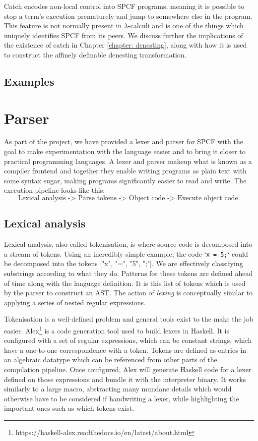 \documentclass[12pt,a4paper]{report}
\theoremstyle{definition}
\theoremstyle{remark}
\begin{document}
Catch encodes non-local control into SPCF programs, meaning it is possible to stop a term's execution prematurely and jump to somewhere else in the program. This feature is not normally present in $\lambda$-calculi and is one of the things which uniquely identifies SPCF from its peers. We discuss further the implications of the existence of catch in Chapter \ref{chapter: denesting}, along with how it is used to construct the affinely definable denesting transformation.

\subsection{Examples}

\section{Parser}
As part of the project, we have provided a lexer and parser for SPCF with the goal to make experimentation with the language easier and to bring it closer to practical programming languages. A lexer and parser makeup what is known as a compiler frontend and together they enable writing programs as plain text with some syntax sugar, making programs significantly easier to read and write. The execution pipeline looks like this:
\[\text{Lexical analysis -> Parse tokens -> Object code -> Execute object code}.\]

\subsection{Lexical analysis}
Lexical analysis, also called tokenisation, is where source code is decomposed into a stream of tokens. Using an incredibly simple example, the code `\lstinline{x = 5;}` could be decomposed into the tokens ["x", "=", "5", ";"]. We are effectively classifying substrings according to what they do. Patterns for these tokens are defined ahead of time along with the language definition. It is this list of tokens which is used by the parser to construct an AST. The action of \emph{lexing} is conceptually similar to applying a series of nested regular expressions.

Tokenisation is a well-defined problem and general tools exist to the make the job easier. Alex\footnote{https://haskell-alex.readthedocs.io/en/latest/about.html} is a code generation tool used to build lexers in Haskell. It is configured with a set of regular expressions, which can be constant strings, which have a one-to-one correspondence with a token. Tokens are defined as entries in an algebraic datatype which can be referenced from other parts of the compilation pipeline. Once configured, Alex will generate Haskell code for a lexer defined on those expressions and bundle it with the interpreter binary. It works similarly to a large macro, abstracting many mundane details 
which would otherwise have to be considered if handwriting a lexer, while highlighting the important ones such as which tokens exist.
\end{document}
